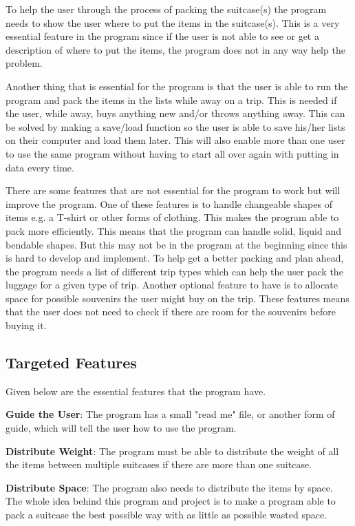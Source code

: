 To help the user through the process of packing the suitcase(s) the program needs to show the user where to put the items in the suitcase(s). This is a very essential feature in the program since if the user is not able to see or get a description of where to put the items, the program does not in any way help the problem.

Another thing that is essential for the program is that the user is able to run the program and pack the items in the lists while away on a trip. This is needed if the user, while away, buys anything new and/or throws anything away. This can be solved by making a save/load function so the user is able to save his/her lists on their computer and load them later. This will also enable more than one user to use the same program without having to start all over again with putting in data every time.  

There are some features that are not essential for the program to work but will improve the program. 
One of these features is to handle changeable shapes of items e.g. a T-shirt or other forms of clothing. This makes the program able to pack more efficiently. This means that the program can handle solid, liquid and bendable shapes. But this may not be in the program at the beginning since this is hard to develop and implement.
To help get a better packing and plan ahead, the program needs a list of different trip types which can help the user pack the luggage for a given type of trip.
Another optional feature to have is to allocate space for possible souvenirs the user might buy on the trip. These features means that the user does not need to check if there are room for the souvenirs before buying it.

\subsection{Targeted Features}
Given below are the essential features that the program have.

\textbf{Guide the User}:
The program has a small "read me" file, or another form of guide, which will tell the user how to use the program.
\newline

\textbf{Distribute Weight}:
The program must be able to distribute the weight of all the items between multiple suitcases if there are more than one suitcase.
\newline

\textbf{Distribute Space}:
The program also needs to distribute the items by space. The whole idea behind this program and project is to make a program able to pack a suitcase the best possible way with as little as possible wasted space.
\newline

